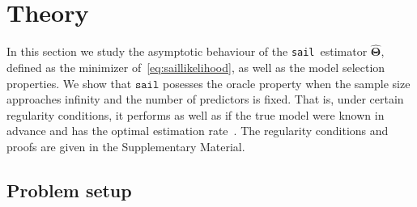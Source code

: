 \documentclass[12pt,letter]{article}\usepackage[]{graphicx}\usepackage[]{color}
\newcommand{\sail}{\texttt{sail}}
\newcommand{\bTheta}{\boldsymbol{\Theta}}
\begin{document}
\section{Theory}


In this section we study the asymptotic behaviour of the \sail ~estimator $\widehat{\bTheta}$, defined as the minimizer of~\eqref{eq:saillikelihood}, as well as the model selection properties. We show that $\texttt{{sail}}$ posesses the oracle property when the sample size approaches infinity and the number of predictors is fixed. That is, under certain regularity conditions, it performs as well as if the true model were known in advance and has the optimal estimation rate~\citep{zou2006adaptive}. The regularity conditions and proofs are given in the Supplementary Material. 

\subsection{Problem setup}
\end{document}
